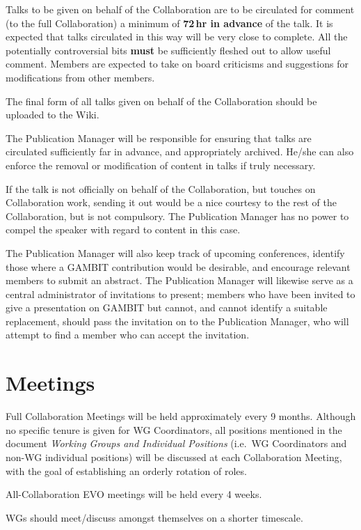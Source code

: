 Talks to be given on behalf of the Collaboration are to be circulated for comment (to the full Collaboration) a minimum of \textbf{72\,hr in advance} of the talk.  It is expected that talks circulated in this way will be very close to complete.  All the potentially controversial bits \textbf{must} be sufficiently fleshed out to allow useful comment.  Members are expected to take on board criticisms and suggestions for modifications from other members.  

The final form of all talks given on behalf of the Collaboration should be uploaded to the Wiki.

The Publication Manager will be responsible for ensuring that talks are circulated sufficiently far in advance, and appropriately archived.  He/she can also enforce the removal or modification of content in talks if truly necessary.

If the talk is not officially on behalf of the Collaboration, but touches on Collaboration work, sending it out would be a nice courtesy to the rest of the Collaboration, but is not compulsory.  The Publication Manager has no power to compel the speaker with regard to content in this case.

The Publication Manager will also keep track of upcoming conferences, identify those where a GAMBIT contribution would be desirable, and encourage relevant members to submit an abstract.  The Publication Manager will likewise serve as a central administrator of invitations to present; members who have been invited to give a presentation on GAMBIT but cannot, and cannot identify a suitable replacement, should pass the invitation on to the Publication Manager, who will attempt to find a member who can accept the invitation.


\section{Meetings}

Full Collaboration Meetings will be held approximately every 9 months.  Although no specific tenure is given for WG Coordinators, all positions mentioned in the document \textit{Working Groups and Individual Positions} (i.e.\ WG Coordinators and non-WG individual positions) will be discussed at each Collaboration Meeting, with the goal of establishing an orderly rotation of roles.

All-Collaboration EVO meetings will be held every 4 weeks.

WGs should meet/discuss amongst themselves on a shorter timescale.  


